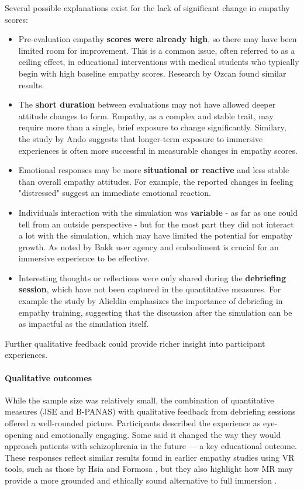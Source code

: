 Several possible explanations exist for the lack of significant change in empathy scores:
\begin{itemize}
  \item Pre-evaluation empathy \textbf{scores were already high}, so there may have been limited room for improvement. This is a common issue, often referred to as a ceiling effect, in educational interventions with medical students who typically begin with high baseline empathy scores. Research by Ozcan \cite{Ozcan2018} found similar results.
  \item The \textbf{short duration} between evaluations may not have allowed deeper attitude changes to form. Empathy, as a complex and stable trait, may require more than a single, brief exposure to change significantly. Similary, the study by Ando \cite{Ando2011} suggests that longer-term exposure to immersive experiences is often more successful in measurable changes in empathy scores.
  \item Emotional responses may be more \textbf{situational or reactive} and less stable than overall empathy attitudes. For example, the reported changes in feeling "distressed" suggest an immediate emotional reaction.
  \item Individuals interaction with the simulation was \textbf{variable} - as far as one could tell from an outside perspective - but for the most part they did not interact a lot with the simulation, which may have limited the potential for empathy growth. As noted by Bakk \cite{Bakk2023} user agency and embodiment is crucial for an immersive experience to be effective. 
  \item Interesting thoughts or reflections were only shared during the \textbf{debriefing session}, which have not been captured in the quantitative measures. For example the study by Alieldin \cite{Alieldin2024} emphasizes the importance of debriefing in empathy training, suggesting that the discussion after the simulation can be as impactful as the simulation itself.
\end{itemize}

Further qualitative feedback could provide richer insight into participant experiences.

\paragraph{Qualitative outcomes}
While the sample size was relatively small, the combination of quantitative measures (JSE and B-PANAS) with qualitative feedback from debriefing sessions offered a well-rounded picture. Participants described the experience as eye-opening and emotionally engaging. Some said it changed the way they would approach patients with schizophrenia in the future — a key educational outcome. These responses reflect similar results found in earlier empathy studies using VR tools, such as those by Hsia \cite{Hsia2022} and Formosa \cite{Formosa2018}, but they also highlight how MR may provide a more grounded and ethically sound alternative to full immersion \cite{Hsia2022, Formosa2018}.

